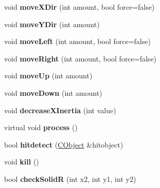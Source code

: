 \begin{DoxyCompactItemize}
\item 
\hypertarget{class_c_object_a3478f733c17527d21d111a8599c46e81}{
void {\bfseries moveXDir} (int amount, bool force=false)}
\label{class_c_object_a3478f733c17527d21d111a8599c46e81}

\item 
\hypertarget{class_c_object_afba8c879743f3e5cb702039c7ac53795}{
void {\bfseries moveYDir} (int amount)}
\label{class_c_object_afba8c879743f3e5cb702039c7ac53795}

\item 
\hypertarget{class_c_object_ab0e5f5e228db363e4a6b2d34e1e98e30}{
void {\bfseries moveLeft} (int amount, bool force=false)}
\label{class_c_object_ab0e5f5e228db363e4a6b2d34e1e98e30}

\item 
\hypertarget{class_c_object_a26345c0b5906e18897f875c5723d258d}{
void {\bfseries moveRight} (int amount, bool force=false)}
\label{class_c_object_a26345c0b5906e18897f875c5723d258d}

\item 
\hypertarget{class_c_object_ad48c611da8ece5ff2d6139eb18a0f524}{
void {\bfseries moveUp} (int amount)}
\label{class_c_object_ad48c611da8ece5ff2d6139eb18a0f524}

\item 
\hypertarget{class_c_object_a2d65f7141c0e1375f599fac8e5ce6a64}{
void {\bfseries moveDown} (int amount)}
\label{class_c_object_a2d65f7141c0e1375f599fac8e5ce6a64}

\item 
\hypertarget{class_c_object_a8ef336dab6432a614615b2c0023a3d0f}{
void {\bfseries decreaseXInertia} (int value)}
\label{class_c_object_a8ef336dab6432a614615b2c0023a3d0f}

\item 
\hypertarget{class_c_object_acf6f3841b93b218c02a981386a92d08a}{
virtual void {\bfseries process} ()}
\label{class_c_object_acf6f3841b93b218c02a981386a92d08a}

\item 
\hypertarget{class_c_object_a84a03c359cc72b09f4733c91887abd1c}{
bool {\bfseries hitdetect} (\hyperlink{class_c_object}{CObject} \&hitobject)}
\label{class_c_object_a84a03c359cc72b09f4733c91887abd1c}

\item 
\hypertarget{class_c_object_ab4383599072fcc856b7c7685a6f58221}{
void {\bfseries kill} ()}
\label{class_c_object_ab4383599072fcc856b7c7685a6f58221}

\item 
\hypertarget{class_c_object_a53a229d7fb40f446605e18bc8c6c891f}{
bool {\bfseries checkSolidR} (int x2, int y1, int y2)}
\label{class_c_object_a53a229d7fb40f446605e18bc8c6c891f}


\end{DoxyCompactItemize}
